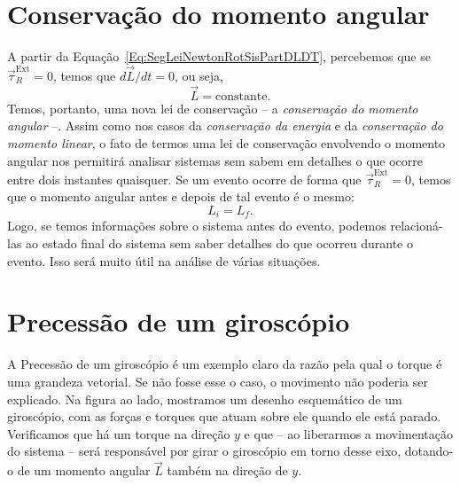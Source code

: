 \section{Conservação do momento angular}

A partir da Equação~\ref{Eq:SegLeiNewtonRotSisPartDLDT}, percebemos que se $\vec{\tau}_R^{\textrm{Ext}} = 0$, temos que $d\vec{L}/dt = 0$, ou seja,
\begin{equation}
  \vec{L} = \textrm{constante}.
\end{equation}
%
Temos, portanto, uma nova lei de conservação -- a \emph{conservação do momento angular} --. Assim como nos casos da \emph{conservação da energia} e da \emph{conservação do momento linear}, o fato de termos uma lei de conservação envolvendo o momento angular nos permitirá analisar sistemas sem sabem em detalhes o que ocorre entre dois instantes quaisquer. Se um evento ocorre de forma que $\vec{\tau}_R^{\textrm{Ext}} = 0$, temos que o momento angular antes e depois de tal evento é o mesmo:
\begin{equation}
  L_i = L_f.
\end{equation}
%
Logo, se temos informações sobre o sistema antes do evento, podemos relacioná-las ao estado final do sistema sem saber detalhes do que ocorreu durante o evento. Isso será muito útil na análise de várias situações.

\section{Precessão de um giroscópio}

A Precessão de um giroscópio é um exemplo claro da razão pela qual o torque é uma grandeza vetorial. Se não fosse esse o caso, o movimento não poderia ser explicado. Na figura ao lado, mostramos um desenho esquemático de um giroscópio, com as forças e torques que atuam sobre ele quando ele está parado. Verificamos que há um torque na direção $y$ e que -- ao liberarmos a movimentação do sistema -- será responsável por girar o giroscópio em torno desse eixo, dotando-o de um momento angular $\vec{L}$ também na direção de $y$.

